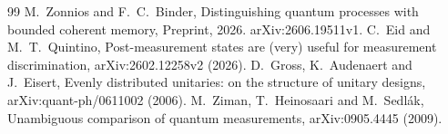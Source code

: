 \begin{thebibliography}{99}
 M.~Zonnios and F.~C.~Binder,
Distinguishing quantum processes with bounded coherent memory,
Preprint, 2026. arXiv:2606.19511v1.
 C.~Eid and M.~T.~Quintino,
Post-measurement states are (very) useful for measurement discrimination,
arXiv:2602.12258v2 (2026).
 D.~Gross, K.~Audenaert and J.~Eisert,
Evenly distributed unitaries: on the structure of unitary designs,
arXiv:quant-ph/0611002 (2006).
 M.~Ziman, T.~Heinosaari and M.~Sedl\'ak,
Unambiguous comparison of quantum measurements,
arXiv:0905.4445 (2009).
\end{thebibliography}
